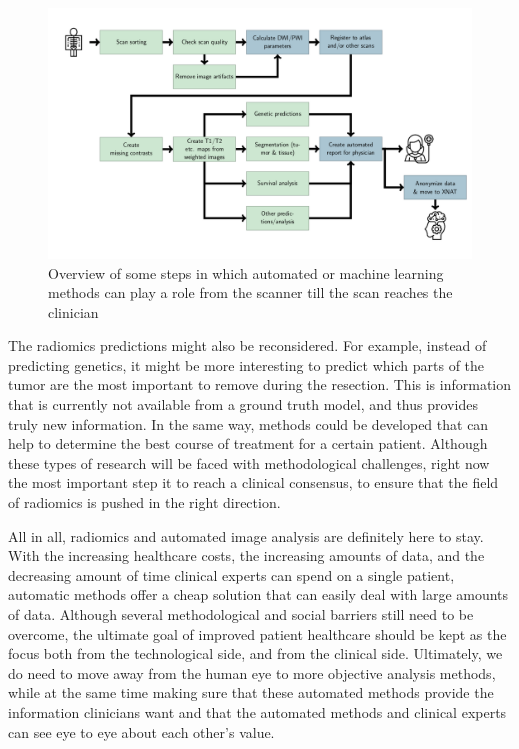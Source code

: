 \begin{figure}[htbp]
\includegraphics[width=\textwidth]{Figures/Pipeline.png}
\caption{Overview of some steps in which automated or machine learning methods can play a role from the scanner till the scan reaches the clinician}\label{fig:discussion_pipeline_automatic}
\end{figure}

The radiomics predictions might also be reconsidered.
For example, instead of predicting genetics, it might be more interesting to predict which parts of the \gls{tumor} are the most important to remove during the resection.
This is information that is currently not available from a ground truth model, and thus provides truly new information.
In the same way, methods could be developed that can help to determine the best course of treatment for a certain patient.
Although these types of research will be faced with methodological challenges, right now the most important step it to reach a clinical consensus, to ensure that the field of radiomics is pushed in the right direction.

All in all, radiomics and automated image analysis are definitely here to stay.
With the increasing healthcare costs, the increasing amounts of data, and the decreasing amount of time clinical experts can spend on a single patient, automatic methods offer a cheap solution that can easily deal with large amounts of data.
Although several methodological and social barriers still need to be overcome, the ultimate goal of improved patient healthcare should be kept as the focus both from the technological side, and from the clinical side.
Ultimately, we do need to move away from the human eye to more objective analysis methods, while at the same time making sure that these automated methods provide the information clinicians want and that the automated methods and clinical experts can see eye to eye about each other's value.
